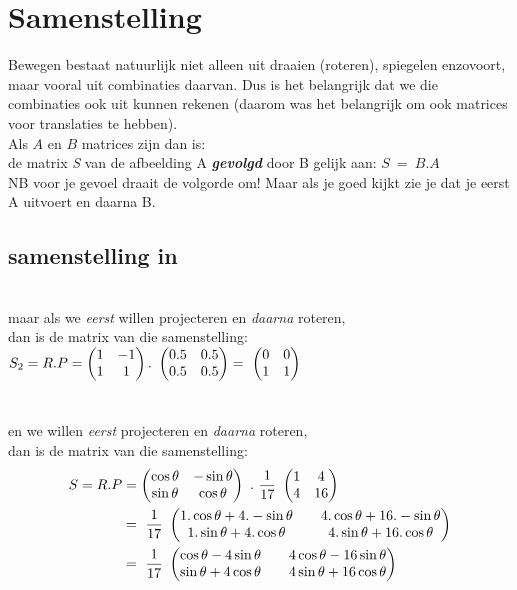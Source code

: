 \documentclass[hidelinks, a4wide, 12pt,  twoside]{book}
\begin{document}
\section{Samenstelling}		
Bewegen bestaat natuurlijk niet alleen uit draaien (roteren), spiegelen enzovoort, maar vooral uit combinaties daarvan. Dus is het belangrijk dat we die combinaties ook uit kunnen rekenen (daarom was het belangrijk om ook matrices voor translaties te hebben). \\ 
{Als $ A $ en $ B $  matrices zijn dan is:\\
	de matrix\textit{ S }van de afbeelding A \textit{\textbf{gevolgd}} door  B 	gelijk aan:
	\quad $ S\ = \ B . A $ \\ NB voor je gevoel draait de volgorde om! Maar als je goed kijkt zie je dat je eerst A uitvoert en daarna B.}
\subsection{samenstelling in \RT}
 \\
maar als we \textit{eerst} willen  projecteren en \textit{daarna}  roteren, \\ dan is de matrix van die samenstelling:\\
$  S_2 = R.P
= \begin{pmatrix}  1 & -1  \\  1 & 1  \end{pmatrix} . 
\ \begin{pmatrix}  0.5 & 0.5  \\  0.5 & 0.5  \end{pmatrix} 
= \ \begin{pmatrix}  0 & 0  \\  1 & 1  \end{pmatrix}
$ \\ \\ \\
en we willen \textit{eerst} projecteren  en \textit{daarna} roteren, \\
dan is de matrix van die samenstelling: 
\begin{align*} 
S = R.P 
&=	  \mattwee { \cos \theta & -\sin \theta }
{ \sin \theta & \cos \theta}  \ . \ 
\frac{1}{17} \  \mattwee { 1 & 4 }
{ 4  & 16 }  \\
& = \   \frac{1}{17} \  
\mattwee { 1.\cos \theta + 4.-\sin \theta  & & 4.\cos \theta + 16.-\sin \theta  }
{ 1.\sin \theta + 4.\cos \theta &  &4.\sin \theta + 16.\cos \theta}  \\  
& = \   \frac{1}{17} \  
\mattwee { \cos \theta - 4\sin \theta  & & 4\cos \theta - 16\sin \theta  }
{ \sin \theta + 4\cos \theta & & 4\sin \theta + 16\cos \theta}                                                
\end{align*} 
\end{document}
